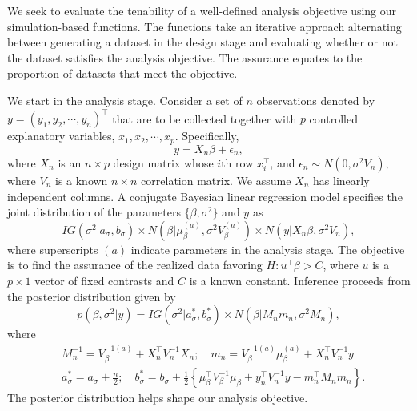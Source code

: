 We seek to evaluate the tenability of a  well-defined analysis
objective using our simulation-based functions. The functions take an iterative approach alternating between generating a dataset in the design stage and evaluating whether or not the dataset satisfies the analysis objective. The assurance equates to the proportion of datasets that meet the objective. 

We start in the analysis stage.
Consider a set of $n$ observations denoted by 
$y = (y_1, y_2, \cdots, y_n)^{\top}$ that are to be collected
together with $p$ controlled explanatory variables,
$x_1, x_2, \cdots, x_p$. Specifically,
\[y = X_n\beta + \epsilon_n,\] 
where $X_n$ is an $n \times p$ design matrix whose $i$th row 
$x_i^{\top}$, and $\epsilon_n \sim N(0, \sigma^2V_n)$, 
where $V_n$ is a known $n \times n$ correlation matrix. 
We assume $X_n$ has linearly independent columns. 
A conjugate Bayesian linear regression model specifies the
joint distribution of the parameters $\{\beta, \sigma^2\}$
and $y$ as 
\[
IG(\sigma^2|a_{\sigma}, b_{\sigma}) \times N(\beta|\mu_{\beta}^{(a)},
\sigma^2V_{\beta}^{(a)}) \times N(y | X_n\beta, \sigma^2V_n),
\]
where superscripts $(a)$ indicate parameters in the analysis stage. 
The objective is to find  
the assurance of the realized 
data favoring $H: u^{\top}\beta > C$, where $u$ is a 
$p \times 1$ vector of fixed contrasts and $C$ is a known constant. 
Inference proceeds from the posterior 
distribution given by 
\begin{equation}
\label{eq:post_dist}
p(\beta, \sigma^2|y) = IG(\sigma^2|a_{\sigma}^*, b_{\sigma}^*)
\times N(\beta|M_nm_n, \sigma^2M_n),
\end{equation}
where 
\begin{align*}
    & M_n^{-1} = V_{\beta}^{-1(a)} + X_n^{\top}V_n^{-1}X_n; \quad m_n = V_{\beta}^{-1(a)}\mu_{\beta}^{(a)} + X_n^{\top}V_n^{-1}y \\
    & a^*_{\sigma} = a_{\sigma}+\frac{n}{2}; \quad 
    b^*_{\sigma} = b_{\sigma} +
    \frac{1}{2}\left\{\mu_{\beta}^{\top}V_{\beta}^{-1}\mu_{\beta} +
    y_n^{\top}V_n^{-1}y - m_n^{\top}M_nm_n\right\}.
\end{align*}
The posterior distribution helps shape our
analysis objective. 

